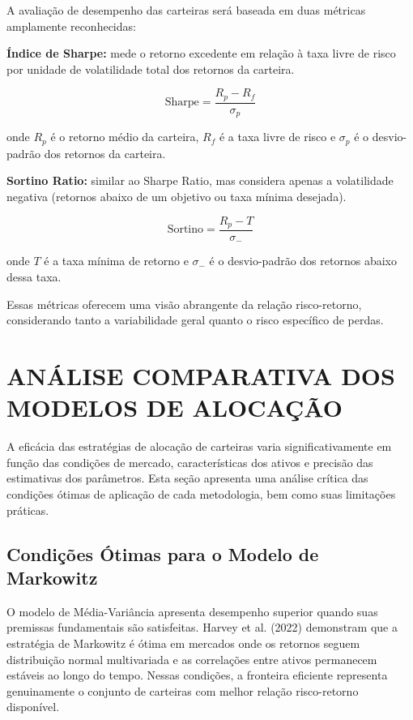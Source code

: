 A avaliação de desempenho das carteiras será baseada em duas métricas amplamente reconhecidas:

\textbf{Índice de Sharpe:} mede o retorno excedente em relação à taxa livre de risco por unidade de volatilidade total dos retornos da carteira.

\begin{equation}
\label{eq:sharpe_ratio}
\text{Sharpe} = \frac{R_p - R_f}{\sigma_p}
\end{equation}

onde $R_p$ é o retorno médio da carteira, $R_f$ é a taxa livre de risco e $\sigma_p$ é o desvio-padrão dos retornos da carteira.

\textbf{Sortino Ratio:} similar ao Sharpe Ratio, mas considera apenas a volatilidade negativa (retornos abaixo de um objetivo ou taxa mínima desejada).

\begin{equation}
\label{eq:sortino_ratio}
\text{Sortino} = \frac{R_p - T}{\sigma_-}
\end{equation}

onde $T$ é a taxa mínima de retorno e $\sigma_-$ é o desvio-padrão dos retornos abaixo dessa taxa.

Essas métricas oferecem uma visão abrangente da relação risco-retorno, considerando tanto a variabilidade geral quanto o risco específico de perdas.

\section{ANÁLISE COMPARATIVA DOS MODELOS DE ALOCAÇÃO}

A eficácia das estratégias de alocação de carteiras varia significativamente em função das condições de mercado, características dos ativos e precisão das estimativas dos parâmetros. Esta seção apresenta uma análise crítica das condições ótimas de aplicação de cada metodologia, bem como suas limitações práticas.

\subsection{Condições Ótimas para o Modelo de Markowitz}

O modelo de Média-Variância apresenta desempenho superior quando suas premissas fundamentais são satisfeitas. Harvey et al. (2022) demonstram que a estratégia de Markowitz é ótima em mercados onde os retornos seguem distribuição normal multivariada e as correlações entre ativos permanecem estáveis ao longo do tempo. Nessas condições, a fronteira eficiente representa genuinamente o conjunto de carteiras com melhor relação risco-retorno disponível.

